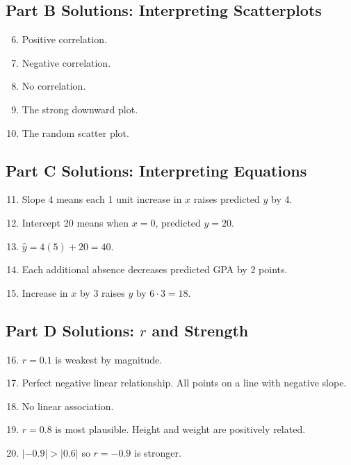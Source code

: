 \documentclass[12pt]{article}
\begin{document}
\subsection*{Part B Solutions: Interpreting Scatterplots}
\begin{enumerate}
  \setcounter{enumi}{5}
  \item Positive correlation.
  \item Negative correlation.
  \item No correlation.
  \item The strong downward plot.
  \item The random scatter plot.
\end{enumerate}

\subsection*{Part C Solutions: Interpreting Equations}
\begin{enumerate}
  \setcounter{enumi}{10}
  \item Slope 4 means each 1 unit increase in \(x\) raises predicted \(y\) by 4.
  \item Intercept 20 means when \(x=0\), predicted \(y=20\).
  \item \(\hat{y}=4(5)+20=40\).
  \item Each additional absence decreases predicted GPA by 2 points.
  \item Increase in \(x\) by 3 raises \(y\) by \(6\cdot3=18\).
\end{enumerate}

\subsection*{Part D Solutions: \(r\) and Strength}
\begin{enumerate}
  \setcounter{enumi}{15}
  \item \(r=0.1\) is weakest by magnitude.
  \item Perfect negative linear relationship. All points on a line with negative slope.
  \item No linear association.
  \item \(r=0.8\) is most plausible. Height and weight are positively related.
  \item \(|-0.9|>|0.6|\) so \(r=-0.9\) is stronger.
\end{enumerate}
\end{document}
